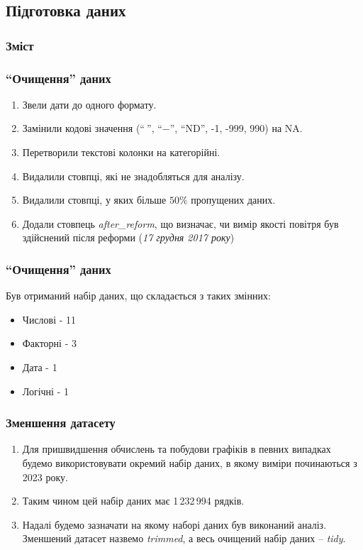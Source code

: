\documentclass{beamer}
\begin{document}
\begin{frame}
  \section{Підготовка даних}

  \frametitle{Зміст}
  \tableofcontents[currentsection]
\end{frame}

\begin{frame}
  \frametitle{``Очищення'' даних}

  \begin{enumerate}
    \item Звели дати до одного формату.
    \item Замінили кодові значення (``$ \ $'', ``$-$'', ``ND'', -1, -999, 990) на NA.
    \item Перетворили текстові колонки на категорійні.
    \item Видалили стовпці, які не знадобляться для аналізу.
    \item Видалили стовпці, у яких більше $50\%$ пропущених даних.
    \item Додали стовпець \textit{after\_reform}, що визначає, чи вимір
    якості повітря був здійснений після реформи (\textit{17 грудня 2017 року})
  \end{enumerate}
\end{frame}

\begin{frame}
  \frametitle{``Очищення'' даних}

  Був отриманий набір даних, що складається з таких змінних:

  \begin{itemize}
    \item Числові - 11
    \item Факторні - 3
    \item Дата - 1
    \item Логічні - 1
  \end{itemize}
\end{frame}

\begin{frame}
  \frametitle{Зменшення датасету}

  \begin{enumerate}
    \item Для пришвидшення обчислень та побудови графіків в певних випадках будемо використовувати
    окремий набір даних, в якому виміри починаються з 2023 року.
    \item Таким чином цей набір даних має 1\,232\,994 рядків.
    \item Надалі будемо зазначати на якому наборі даних був виконаний аналіз. Зменшений
    датасет назвемо \textit{trimmed}, а весь очищений набір даних -- \textit{tidy}.
  \end{enumerate}

\end{frame}
\end{document}
